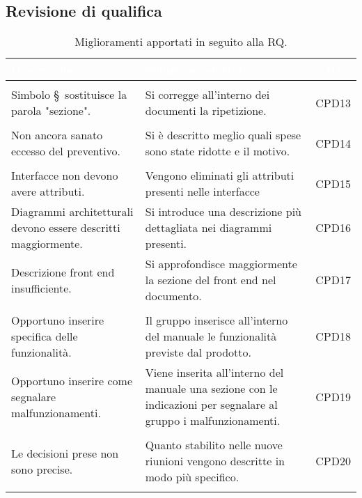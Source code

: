 \subsection{Revisione di qualifica}
\begin{longtable}{|C{4cm}|C{9cm}|c|}
	\textcolor{white}{\textbf{Osservazione}}&
	\textcolor{white}{\textbf{Soluzione adottata}}&
	\textcolor{white}{\textbf{ID}}\label{tab:CriticitàRQ}\\ \hline
	\\ \hline
	Simbolo \S\ sostituisce la parola "sezione". & Si corregge all'interno dei documenti la ripetizione. & CPD13 \\ \hline
	\\ \hline
	Non ancora sanato eccesso del preventivo. & Si è descritto meglio quali spese sono state ridotte e il motivo. & CPD14 \\ \hline
	\\ \hline
	Interfacce non devono avere attributi. & Vengono eliminati gli attributi presenti nelle interfacce & CPD15 \\ \hline
	Diagrammi architetturali devono essere descritti maggiormente. & Si introduce una descrizione più dettagliata nei diagrammi presenti. & CPD16 \\ \hline
	Descrizione front end insufficiente. & Si approfondisce maggiormente la sezione del front end nel documento. & CPD17 \\ \hline
	\\ \hline
	Opportuno inserire specifica delle funzionalità. & Il gruppo inserisce all'interno del manuale le funzionalità previste dal prodotto. & CPD18 \\ \hline
	Opportuno inserire come segnalare malfunzionamenti. & Viene inserita all'interno del manuale una sezione con le indicazioni per segnalare al gruppo i malfunzionamenti. & CPD19 \\ \hline
	\\ \hline
	Le decisioni prese non sono precise. & Quanto stabilito nelle nuove riunioni vengono descritte in modo più specifico. & CPD20 \\ \hline
	\caption{Miglioramenti apportati in seguito alla RQ.}\\
\end{longtable}